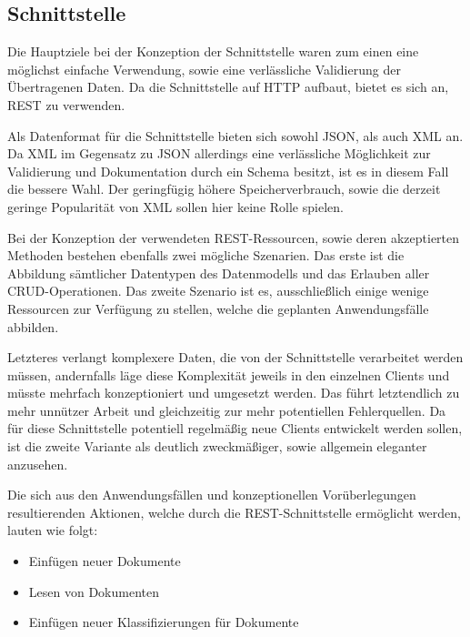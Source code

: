 \subsection{Schnittstelle}
Die Hauptziele bei der Konzeption der Schnittstelle waren zum einen eine möglichst
einfache Verwendung, sowie eine verlässliche Validierung der Übertragenen Daten.
Da die Schnittstelle auf HTTP aufbaut, bietet es sich an, REST zu verwenden.

Als Datenformat für die Schnittstelle bieten sich sowohl JSON, als auch XML an.
Da XML im Gegensatz zu JSON allerdings eine verlässliche Möglichkeit zur Validierung
und Dokumentation durch ein Schema besitzt, ist es in diesem Fall die bessere Wahl.
Der geringfügig höhere Speicherverbrauch, sowie die derzeit geringe Popularität
von XML sollen hier keine Rolle spielen.

Bei der Konzeption der verwendeten REST-Ressourcen, sowie deren akzeptierten Methoden
bestehen ebenfalls zwei mögliche Szenarien. Das erste ist die Abbildung sämtlicher
Datentypen des Datenmodells und das Erlauben aller CRUD-Operationen.
Das zweite Szenario ist es, ausschließlich einige wenige Ressourcen zur Verfügung
zu stellen, welche die geplanten Anwendungsfälle abbilden.

Letzteres verlangt komplexere Daten, die von der Schnittstelle verarbeitet werden müssen,
andernfalls läge diese Komplexität jeweils in den einzelnen Clients und müsste
mehrfach konzeptioniert und umgesetzt werden. Das führt letztendlich zu mehr
unnützer Arbeit und gleichzeitig zur mehr potentiellen Fehlerquellen.
Da für diese Schnittstelle potentiell regelmäßig neue Clients entwickelt werden sollen,
ist die zweite Variante als deutlich zweckmäßiger, sowie allgemein eleganter anzusehen.

Die sich aus den Anwendungsfällen und konzeptionellen Vorüberlegungen resultierenden
Aktionen, welche durch die REST-Schnittstelle ermöglicht werden, lauten wie folgt:
\begin{itemize}
	\item Einfügen neuer Dokumente
	\item Lesen von Dokumenten
	\item Einfügen neuer Klassifizierungen für Dokumente
\end{itemize}
